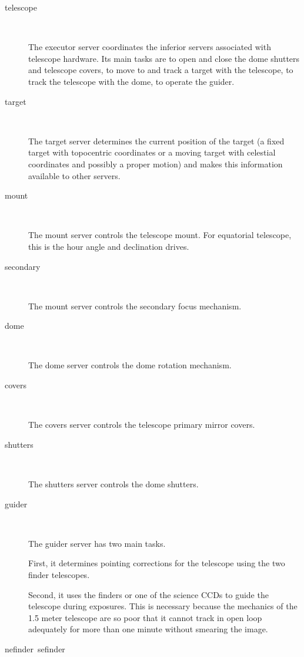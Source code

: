 \documentclass{article}
\newcommand{\server}[1]{{\ttfamily #1}}
\begin{document}
\begin{description}
\item[\server{telescope}]~

The \server{executor} server coordinates the inferior servers associated with telescope hardware. Its main tasks are to open and close the dome shutters and telescope covers, to move to and track a target with the telescope, to track the telescope with the dome, to operate the guider.

\item[\server{target}]~

The \server{target} server determines the current position of the target (a fixed target with topocentric coordinates or a moving target with celestial coordinates and possibly a proper motion) and makes this information available to other servers.

\item[\server{mount}]~

The \server{mount} server controls the telescope mount. For equatorial telescope, this is the hour angle and declination drives.

\item[\server{secondary}]~

The \server{mount} server controls the secondary focus mechanism.

\item[\server{dome}]~

The \server{dome} server controls the dome rotation mechanism.

\item[\server{covers}]~

The \server{covers} server controls the telescope primary mirror covers.

\item[\server{shutters}]~

The \server{shutters} server controls the dome shutters.

\item[\server{guider}]~

The \server{guider} server has two main tasks.

First, it determines pointing corrections for the telescope using the two finder telescopes. 

Second, it uses the finders or one of the science CCDs to guide the telescope during exposures. This is necessary because the mechanics of the 1.5 meter telescope are so poor that it cannot track in open loop adequately for more than one minute without smearing the image.

\item[\server{nefinder}~\server{sefinder}]~


\end{description}
\end{document}
